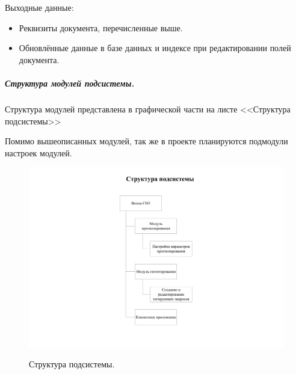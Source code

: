 Выходные данные:
\begin{itemize}
\item Реквизиты документа, перечисленные выше.
\item Обновлённые данные в базе данных и индексе при редактировании полей документа.
\end{itemize}


\subparagraph{Структура модулей подсистемы.} \hfill

Структура модулей представлена в графической части на листе <<Структура подсистемы>>

Помимо вышеописанных модулей, так же в проекте планируются подмодули настроек модулей.

\begin{figure}[!h]
\centering
\includegraphics[width=\textwidth]{design/ramkaless/6.png}
\label{figure:structPodsis}
\caption{Структура подсистемы.}
\end{figure}